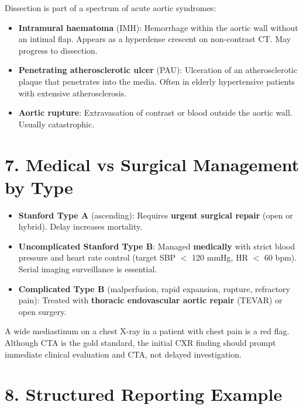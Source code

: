 Dissection is part of a spectrum of acute aortic syndromes:
\begin{itemize}
  \item \textbf{Intramural haematoma} (IMH): Hemorrhage within the aortic wall without an intimal flap. Appears as a hyperdense crescent on non-contrast CT. May progress to dissection.
  \item \textbf{Penetrating atherosclerotic ulcer} (PAU): Ulceration of an atherosclerotic plaque that penetrates into the media. Often in elderly hypertensive patients with extensive atherosclerosis.
  \item \textbf{Aortic rupture}: Extravasation of contrast or blood outside the aortic wall. Usually catastrophic.
\end{itemize}


\section{7. Medical vs Surgical Management by Type}

\begin{itemize}
  \item \textbf{Stanford Type A} (ascending): Requires \textbf{urgent surgical repair} (open or hybrid). Delay increases mortality.
  \item \textbf{Uncomplicated Stanford Type B}: Managed \textbf{medically} with strict blood pressure and heart rate control (target SBP $<$ 120 mmHg, HR $<$ 60 bpm). Serial imaging surveillance is essential.
  \item \textbf{Complicated Type B} (malperfusion, rapid expansion, rupture, refractory pain): Treated with \textbf{thoracic endovascular aortic repair} (TEVAR) or open surgery.
\end{itemize}

\begin{pearlbox}
A wide mediastinum on a chest X-ray in a patient with chest pain is a red flag. Although CTA is the gold standard, the initial CXR finding should prompt immediate clinical evaluation and CTA, not delayed investigation.
\end{pearlbox}


\section{8. Structured Reporting Example}

